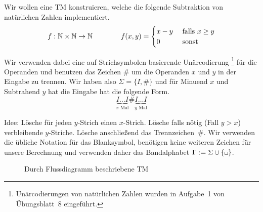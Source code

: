 \begin{Bsp}
	Wir wollen eine \ac{TM} konstruieren, welche die folgende Subtraktion von natürlichen Zahlen implementiert.
	$$
	f: \mathbb{N}\times\mathbb{N}\rightarrow \mathbb{N}
	\qquad \qquad
	f(x,y)=
	\begin{cases}
		x - y & \text{ falls } x\geq y\\
		0  & \text{ sonst}
	\end{cases}
	$$
	
	Wir verwenden dabei eine auf Strichsymbolen basierende Unärcodierung
	\footnote{Unärcodierungen von natürlichen Zahlen wurden in Aufgabe~1 von Übungsblatt~8 eingeführt.}
	für die Operanden
	und benutzen das Zeichen $\#$ um die Operanden $x$ und $y$ in der Eingabe zu trennen.
	Wir haben also $\Sigma=\{I,\#\}$ und für Minuend $x$ und Subtrahend $y$ hat die Eingabe hat die folgende Form. 
	$$\underbrace{I\ldots I}_{x\text{ Mal}}\#\underbrace{I\ldots I}_{y\text{ Mal}}$$
	
	
	Idee: Lösche für jeden $y$-Strich einen $x$-Strich.
	Lösche falls nötig (Fall $y>x$) verbleibende $y$-Striche. Lösche anschließend das Trennzeichen~$\#$.
	Wir verwenden die übliche Notation für das Blanksymbol, 
	benötigen keine weiteren Zeichen für unsere Berechnung und verwenden daher das Bandalphabet $\Gamma:=\Sigma\cup\{\mblank\}$.
	
	\begin{figure}[H]\centering
		\caption{Durch Flussdiagramm beschriebene \ac{TM}}
		\label{fig:subtraction}
	\end{figure}
	

\end{Bsp}
